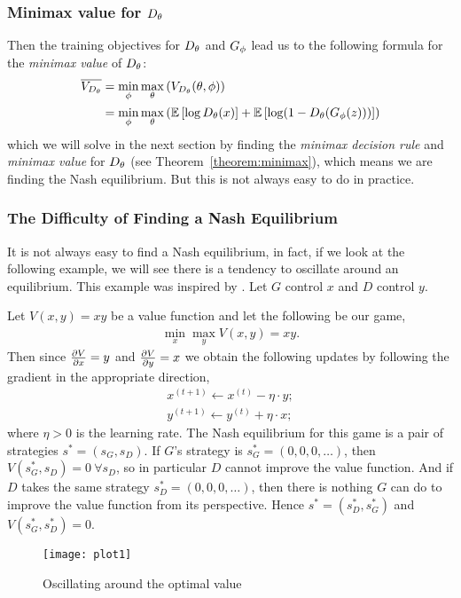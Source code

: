 \subsubsection{Minimax value for $D_\theta$}

Then the training objectives for $D_\theta$ and $G_\phi$ lead us to the
following formula for the \textit{minimax value} of $D_\theta$:
\begin{align}
  \overline{V_{D_\theta}} & = \min_{\phi}\max_{\theta}\left(V_{D_\theta}(\theta,
                      \phi) \right) \\
                    & =
                      \min_{\phi}\max_{\theta}\left(\mathbb{E}\left[\log{D_\theta(x)}\right]
                      +
                      \mathbb{E}\left[\log(1 - D_\theta(G_\phi(z)))\right] \right)
\end{align}
which we will solve in the next section by finding the \textit{minimax
  decision rule} and \textit{minimax value} for $D_\theta$ (see
Theorem~\ref{theorem:minimax}), which means we are finding the Nash
equilibrium.  But this is not always easy to do in practice.

\subsubsection{The Difficulty of Finding a Nash Equilibrium}
\label{sec:difficulty}

It is not always easy to find a Nash equilibrium, in fact, if we look
at the following example, we will see there is a tendency to oscillate
around an equilibrium. This example was inspired by
\cite{ref:weng-2017}.  Let $G$ control $x$ and $D$ control $y$.

\begin{example}
  Let $V(x, y) = xy$ be a value function and let the following be our
  game,
  \begin{align}
    \min_x\max_yV(x, y) = xy.
  \end{align}
  Then since ${\partial{V} \over \partial{x}} = y$ and
  ${\partial{V} \over \partial{y}} = x$ we obtain the following
  updates by following the gradient in the appropriate direction,
  \begin{align}
    x^{(t+1)} \gets x^{(t)} - \eta \cdot y; \\
    y^{(t+1)} \gets y^{(t)} + \eta \cdot x;
  \end{align}
  where $\eta > 0$ is the learning rate. The Nash equilibrium for this
  game is a pair of strategies $s^* = (s_G, s_D)$. If $G$'s strategy
  is $s^*_G = (0, 0, 0, \dots)$, then $V(s^*_G, s_D) = 0\ \forall s_D$, so
  in particular $D$ cannot improve the value function.  And if $D$
  takes the same strategy $s^*_D = (0, 0, 0, \dots)$, then there is
  nothing $G$ can do to improve the value function from its
  perspective.  Hence $s^* = (s^*_D, s^*_G)$ and $V(s^*_G, s^*_D) = 0$.

  \begin{figure}[H]
    \centering
    \texttt{[image: plot1]}
    \caption{Oscillating around the optimal value}
    \label{fig:alternating}
  \end{figure}
\end{example}

